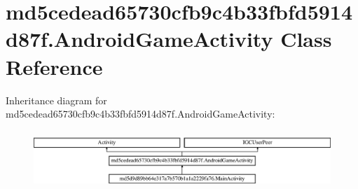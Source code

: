 \hypertarget{classmd5cedead65730cfb9c4b33fbfd5914d87f_1_1AndroidGameActivity}{}\section{md5cedead65730cfb9c4b33fbfd5914d87f.\+Android\+Game\+Activity Class Reference}
\label{classmd5cedead65730cfb9c4b33fbfd5914d87f_1_1AndroidGameActivity}
Inheritance diagram for md5cedead65730cfb9c4b33fbfd5914d87f.\+Android\+Game\+Activity\+:\begin{figure}[H]
\begin{center}
\leavevmode
\includegraphics[height=2.222222cm]{classmd5cedead65730cfb9c4b33fbfd5914d87f_1_1AndroidGameActivity}
\end{center}
\end{figure}
